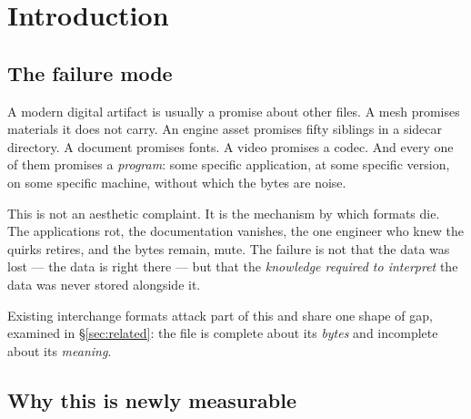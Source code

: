 \documentclass[10pt,twocolumn,letterpaper]{article}
\begin{document}
\begin{abstract}
Around that experiment we report four independent consumers, each with a measured
gate: a Rust reference core (10/10), a game engine (3.7$\times$ faster cooked-tier
load, cross-validated by a reader that has never heard of it), a Blender add-on
(16/16, deterministic writer, $8.4\times10^{-8}$\,rad rig round-trip), and an
Unreal Engine plugin (16/16, pixel-identical texture round-trip). We report an
unattended enrichment pipeline (19/19 with 78/78 input-hash recomputations) and a
content-defined-chunking store (1.45$\times$ dedup, 94.7\,\% boundary stability).
And we report, at length, what none of this establishes: $n=1$ per language per
round, a single model family, a lost transcript, a vision path that never once
completed, and a generated image that violates its own prompt's exclusion list ---
which an agent correctly read as evidence that a recipe records instructions, not
guarantees.
\end{abstract}

\section{Introduction}

\subsection{The failure mode}

A modern digital artifact is usually a promise about other files. A mesh promises
materials it does not carry. An engine asset promises fifty siblings in a
sidecar directory. A document promises fonts. A video promises a codec. And every
one of them promises a \emph{program}: some specific application, at some
specific version, on some specific machine, without which the bytes are noise.

This is not an aesthetic complaint. It is the mechanism by which formats die.
The applications rot, the documentation vanishes, the one engineer who knew the
quirks retires, and the bytes remain, mute. The failure is not that the data was
lost --- the data is right there --- but that the \emph{knowledge required to
interpret} the data was never stored alongside it.

Existing interchange formats attack part of this and share one shape of gap,
examined in \S\ref{sec:related}: the file is complete about its \emph{bytes} and
incomplete about its \emph{meaning}.

\subsection{Why this is newly measurable}
\end{document}
